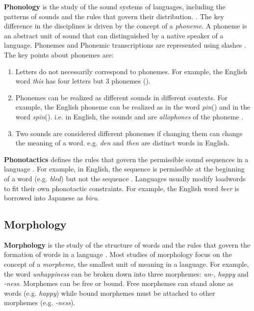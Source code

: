 \textbf{Phonology} is the study of the sound systems of languages, including the patterns of sounds and the rules that govern their distribution. \cite{trask2007language}.
The key difference in the disciplines is driven by the concept of a \textit{phoneme}. A phoneme is an abstract unit of sound that can distinguished
by a native speaker of a language. Phonemes and Phonemic transcriptions are represented using slashes \textipa{/ /}. The key points about phonemes are:
\begin{enumerate}
    \item Letters do not necessarily correspond to phonemes. For example, the English word \textit{this} has four letters but 3 phonemes ().
    \item Phonemes can be realized as different sounds in different contexts. For example, the English phoneme  can be realized as
    \textipa{[p\super{h}]} in the word \textit{pin}(\textipa{[p\super{h}In]}) and \textipa{[p]} in the word \textit{spin}(\textipa{[spIn]}).
    i.e. in English, the sounds \textipa{[p]} and \textipa{[p\super{h}]} are \textit{allophones} of the phoneme .
    \item Two sounds are considered different phonemes if changing them can change the meaning of a word. e.g. \textipa{[dEn]} \textit{den} and 
    \textipa{[DEn]} \textit{then} are distinct words in English.
\end{enumerate}


\textbf{Phonotactics} defines the rules that govern the permissible sound sequences in a language \cite{trask2007language}. For example, in English,
the sequence  is permissible at the beginning of a word (e.g. \textit{bled}) but not the sequence . Languages usually
modify loadwords to fit their own phonotactic constraints. For example, the English word \textit{beer} is borrowed into Japanese as \textit{biru}.


\subsection{Morphology}
\textbf{Morphology} is the study of the structure of words and the rules that govern the formation of words in a language \cite{trask2007language}.
Most studies of morphology focus on the concept of a \textit{morpheme}, the smallest unit of meaning in a language. For example, the word \textit{unhappiness}
can be broken down into three morphemes: \textit{un-}, \textit{happy} and \textit{-ness}. Morphemes can be free or bound. Free morphemes can stand
alone as words (e.g. \textit{happy}) while bound morphemes must be attached to other morphemes (e.g. \textit{-ness}).

